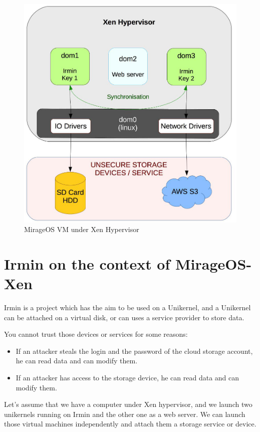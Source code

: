 \documentclass[10pt,a4paper]{report}
\begin{document}
\begin{figure}[H]
\centerline{\includegraphics[scale=0.32]{img/Irmin-MirageOS.jpg}}
\caption{MirageOS VM under Xen Hypervisor}
\end{figure}

\chapter{Irmin on the context of MirageOS-Xen}

Irmin is a project which has the aim to be used on a Unikernel, and a Unikernel can be attached on a virtual disk, or can uses a service provider to store data. \newline

You cannot trust those devices or services for some reasons:
\begin{itemize}
\item If an attacker steals the login and the password of the cloud storage account, he can read data and can modify them.
\item If an attacker has access to the storage device, he can read data and can modify them.
\end{itemize}

Let's assume that we have a computer under Xen hypervisor, and we launch two unikernels running on Irmin and the other one as a web server. We can launch those virtual machines independently and attach them a storage service or device. \newline
\end{document}
